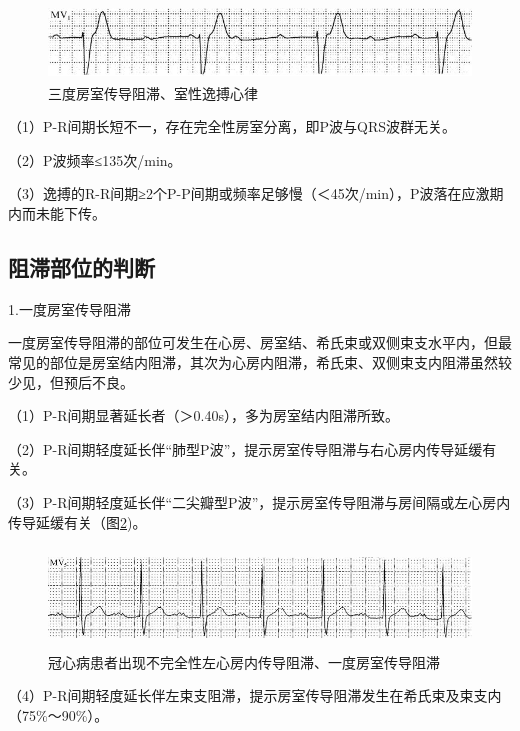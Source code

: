 \begin{figure}[!htbp]
 \centering
 \includegraphics[width=4.79167in,height=0.77083in]{./images/Image00338.jpg}
 \captionsetup{justification=centering}
 \caption{三度房室传导阻滞、室性逸搏心律}
 \label{fig20-9}
  \end{figure} 

（1）P-R间期长短不一，存在完全性房室分离，即P波与QRS波群无关。

（2）P波频率≤135次/min。

（3）逸搏的R-R间期≥2个P-P间期或频率足够慢（＜45次/min），P波落在应激期内而未能下传。

\protect\hypertarget{text00027.htmlux5cux23subid328}{}{}

\subsection{阻滞部位的判断}

1.一度房室传导阻滞

一度房室传导阻滞的部位可发生在心房、房室结、希氏束或双侧束支水平内，但最常见的部位是房室结内阻滞，其次为心房内阻滞，希氏束、双侧束支内阻滞虽然较少见，但预后不良。

（1）P-R间期显著延长者（＞0.40s），多为房室结内阻滞所致。

（2）P-R间期轻度延长伴“肺型P波”，提示房室传导阻滞与右心房内传导延缓有关。

（3）P-R间期轻度延长伴“二尖瓣型P波”，提示房室传导阻滞与房间隔或左心房内传导延缓有关（图\ref{fig20-10})。

\begin{figure}[!htbp]
 \centering
 \includegraphics[width=5.58333in,height=1.0625in]{./images/Image00339.jpg}
 \captionsetup{justification=centering}
 \caption{冠心病患者出现不完全性左心房内传导阻滞、一度房室传导阻滞}
 \label{fig20-10}
  \end{figure} 

（4）P-R间期轻度延长伴左束支阻滞，提示房室传导阻滞发生在希氏束及束支内（75\%～90\%）。

